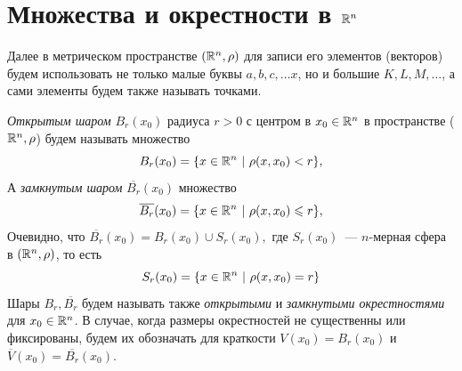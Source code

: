\documentclass[../../main.tex]{subfiles}
\begin{document}
  
  \section{Множества и окрестности в $\mathbb{R}^n$}
  Далее в метрическом пространстве $(\mathbb{R}^n, \rho)$ для записи его 
  элементов (векторов) будем использовать не только малые буквы
  $a, b, c, \dots x$, но и большие $K, L, M, \dots$, а сами 
  элементы будем также называть точками.
  
  \emph{Открытым шаром} $B_r(x_0)$ радиуса $r > 0$ с центром в $x_0 \in 
  \mathbb{R}^n$ в пространстве ($\mathbb{R}^n, \rho$) будем называть множество 
  \[
  B_r(x_0) = \{x \in \mathbb{R}^n\ |\ \rho(x, x_0) < r\}, 
  \]
  А \emph{замкнутым шаром} $\overline{B_r}(x_0)$ множество
  \[
  \overline{B_r}(x_0) = \{x \in \mathbb{R}^n\ |\ \rho(x, x_0) \leqslant r\}, 
  \] 
  Очевидно, что $\overline{B_r}(x_0) = B_r(x_0) \cup S_r(x_0),$ где $ 
  S_r(x_0)$~--- $n$-мерная сфера в  $(\mathbb{R}^n, \rho)$, то есть 
  \[
  S_r(x_0) = \{x \in \mathbb{R}^n\ |\ \rho(x, x_0) = r\}
  \] 
  Шары $B_r, \overline{B_r}$ будем называть также \emph{открытыми} и 
  \emph{замкнутыми окрестностями} для $x_0 \in \mathbb{R}^n$. В случае, 
  когда размеры окрестностей не существенны или фиксированы, 
  будем их обозначать для краткости $V(x_0) = B_r(x_0)$ и 
  $\overline{V}(x_0) = \overline{B_r}(x_0)$.
  
\end{document}

